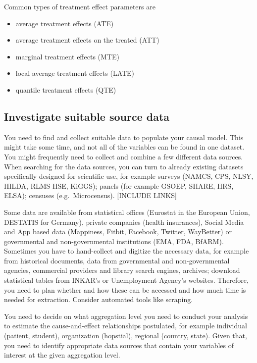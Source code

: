 \documentclass[
]{book}
\providecommand{\tightlist}{%
  \setlength{\itemsep}{0pt}\setlength{\parskip}{0pt}}
\begin{document}
Common types of treatment effect parameters are

\begin{itemize}
\tightlist
\item
  average treatment effects (ATE)
\item
  average treatment effects on the treated (ATT)
\item
  marginal treatment effects (MTE)
\item
  local average treatment effects (LATE)
\item
  quantile treatment effects (QTE)
\end{itemize}

\hypertarget{investigate-suitable-source-data}{%
\subsection{Investigate suitable source
data}\label{investigate-suitable-source-data}}

You need to find and collect suitable data to populate your causal
model. This might take some time, and not all of the variables can be
found in one dataset. You might frequently need to collect and combine a
few different data sources. When searching for the data sources, you can
turn to already existing datasets specifically designed for scientific
use, for example surveys (NAMCS, CPS, NLSY, HILDA, RLMS HSE, KiGGS);
panels (for example GSOEP, SHARE, HRS, ELSA); censuses
(e.g.~Microcensus). {[}INCLUDE LINKS{]}

Some data are available from statistical offices (Eurostat in the
European Union, DESTATIS for Germany), private companies (health
insurances), Social Media and App based data (Mappiness, Fitbit,
Facebook, Twitter, WayBetter) or governmental and non-governmental
institutions (EMA, FDA, BfARM). Sometimes you have to hand-collect and
digitize the necessary data, for example from historical documents, data
from governmental and non-governmental agencies, commercial providers
and library search engines, archives; download statistical tables from
INKAR's or Unemployment Agency's websites. Therefore, you need to plan
whether and how these can be accessed and how much time is needed for
extraction. Consider automated tools like scraping.

You need to decide on what aggregation level you need to conduct your
analysis to estimate the cause-and-effect relationships postulated, for
example individual (patient, student), organization (hopstial), regional
(country, state). Given that, you need to identify appropriate data
sources that contain your variables of interest at the given aggregation
level.
\end{document}
